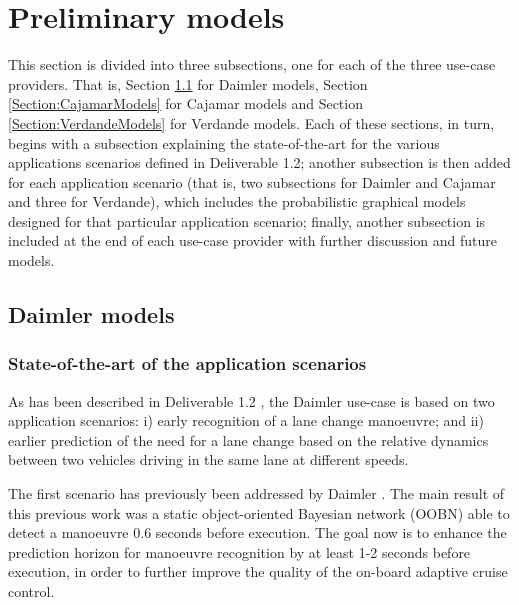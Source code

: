 \section{Preliminary models}\label{Section:PreliminaryModels}
This section is divided into three subsections, one for each of the three use-case providers. That is, Section \ref{Section:DaimlerModels} for Daimler models, Section \ref{Section:CajamarModels} for Cajamar models and Section \ref{Section:VerdandeModels} for Verdande models. Each of these sections, in turn,  begins with a subsection explaining the state-of-the-art for the various applications scenarios defined in Deliverable 1.2; another subsection is then added for each application scenario (that is, two subsections for Daimler and Cajamar and three for Verdande), which includes the probabilistic graphical models designed for that particular application scenario; finally, another subsection is included at the end of each use-case provider with further discussion and future models.

\subsection{Daimler models}\label{Section:DaimlerModels}

\subsubsection{State-of-the-art of the application scenarios}\label{Section:StateOfTheArt}

As has been described in Deliverable 1.2 \cite{Fer14b}, the Daimler use-case is based on two application scenarios: i) early recognition of a lane change manoeuvre; and ii) earlier prediction of the need for a lane change based on the relative dynamics between two vehicles driving in the same lane at different speeds. 

The first scenario has previously been addressed by Daimler \cite{Kasper2011,kasper2012object,KasperThesis2013}. The main result of this previous work was a static object-oriented Bayesian network (OOBN) \cite{KollerPfeffer1997} able to detect a manoeuvre 0.6 seconds before execution. The goal now is to enhance the prediction horizon for manoeuvre recognition by at least 1-2 seconds before execution, in order to further improve the quality of the on-board adaptive cruise control. 

